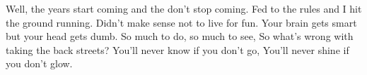 \begin{guitar}
	Well, the years start coming and the don't stop coming. 
	Fed to the rules and I hit the ground running.
	Didn't make sense not to live for fun. 
	Your brain gets smart but your head gets dumb.
	So much to do, so much to see,
	So what's wrong with taking the back streets?
	You'll never know if you don't go, 
	You'll never shine if you don't glow.
	
	\begin{highlightbar}
		 
	\end{highlightbar}
	
\end{guitar}
